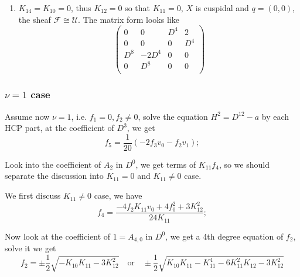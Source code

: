 \documentclass[11pt]{article}
\theoremstyle{definition}
\theoremstyle{plain}
\numberwithin{equation}{section}
\begin{document}
\begin{enumerate}
$$\begin{array}{cc}
	\end{array}
	\right)
	$$
	$$
	G_5=\left(
	\begin{array}{cc}
		D^4+\left(\frac{1}{2}-\frac{I}{2}\right) K_{12} & 2 \\
		\frac{K_{12}^2}{8} & D^4+\left(\frac{1}{2}+\frac{I}{2}\right) K_{12} \\
	\end{array}
	\right)
	$$
	$$
	G_6=\left(
	\begin{array}{cc}
		\frac{1}{4} \left((1-2 I) K_{12}^2-(2-2 I) K_{12} D^4+4 D^8\right) & 2 K_{12}-2 D^4 \\
		\frac{1}{8} K_{12}^2 (K_{12}-D^4) & \frac{1}{4} \left((1+2 I) K_{12}^2-(2+2 I) K_{12} D^4+4 D^8\right) \\
	\end{array}
	\right)
	$$
	\item $K_{14}=K_{10}=0$, thus $K_{12}=0$ so that $K_{11}=0$, $X$ is cuspidal and $q=(0,0)$, the sheaf $\mathcal{F}\cong \mathcal{U}$. The matrix form looks like
	$$
	\left(
	\begin{array}{cccc}
		0 & 0 & D^4 & 2 \\
		0 & 0 & 0 & D^4 \\
		D^8 & -2 D^4 & 0 & 0 \\
		0 & D^8 & 0 & 0 \\
	\end{array}
	\right)
	$$
\end{enumerate}

\subsubsection{$\nu=1$ case}

Assume now $\nu=1$, i.e. $f_1=0, f_2\neq 0$, solve the equation $H^2=D^{12}-a$ by each HCP part, at the coefficient of $D^3$, we get 
$$
f_5=\frac{1}{20} (-2 f_3 v_0-f_2 v_1);
$$

Look into the coefficient of $A_2$ in $D^0$, we get terms of $K_{11}f_4$, so we should separate the discussion into $K_{11}=0$ and $K_{11}\neq 0$ case. 

We first discuss $K_{11}\neq 0$ case, we have 
$$
f_4=\frac{-4f_2 K_{11} v_0+4 f_0^2+3K_{12}^2}{24 K_{11}};
$$

Now look at the coefficient of $1=A_{4,0}$ in $D^0$, we get a 4th degree equation of $f_2$, solve it we get 
$$
f_2=\pm \frac{1}{2} \sqrt{-K_{10} K_{11}-3K_{12}^2}\quad \text{or}\quad \pm\frac{1}{2} \sqrt{K_{10} K_{11}-K_{11}^4-6 K_{11}^2 K_{12}-3 K_{12}^2}
$$
\end{document}
